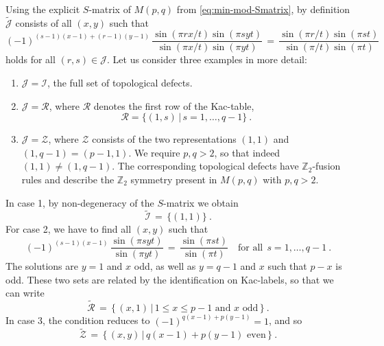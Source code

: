 \documentclass[11pt,a4paper]{article}
\numberwithin{equation}{section}
\begin{document}
\smallskip
Using the explicit $S$-matrix of $M(p,q)$ from \eqref{eq:min-mod-Smatrix}, by definition $\widetilde{\mathcal{J}}$ consists of all $(x,y)$ such that
\begin{equation}
(-1)^{(s-1)(x-1)+(r-1)(y-1)} \,
  \frac{\sin( \pi rx/ t ) \sin( \pi s y  t) }{\sin( \pi x/ t ) \sin( \pi y  t) } 
\,=\,
\frac{\sin( \pi r/ t ) \sin( \pi s  t) }{
\sin( \pi / t ) \sin( \pi   t)}
\end{equation}
holds for all $(r,s) \in \mathcal{J}$.
Let us consider three examples in more detail:
\begin{enumerate}
    \item  $\mathcal{J} = \mathcal{I}$, the full set of topological defects.

    \item  $\mathcal{J} = \mathcal{R}$, where $\mathcal{R}$ denotes the first row of the Kac-table,
\begin{equation}
    \mathcal{R} = \{ (1,s) \,|\, s = 1,\dots,q-1 \} \ .
\end{equation}

    \item $\mathcal{J} = \mathcal{Z}$, where $\mathcal{Z}$ consists of the two representations $(1,1)$ and $(1,q-1)=(p-1,1)$. We require $p,q>2$, so that indeed $(1,1) \neq (1,q-1)$. The corresponding topological defects have $\mathbb{Z}_2$-fusion rules and describe the $\mathbb{Z}_2$ symmetry present in $M(p,q)$ with $p,q>2$.
\end{enumerate}
In case 1, by non-degeneracy of the $S$-matrix we obtain
\begin{equation}\label{eq:tilde-I-just-11}
    \widetilde{\mathcal{I}} \,=\, \{ (1,1) \} \ .
\end{equation}
For case 2, we have to find all $(x,y)$ such that
\begin{equation}
(-1)^{(s-1)(x-1)} \,
  \frac{   \sin( \pi s y  t) }{  \sin( \pi y  t) } 
\,=\,
\frac{ \sin( \pi s  t) }{
 \sin( \pi   t)}
\quad \text{for all} ~~
 s=1,\dots,q-1 \ .
\end{equation}
The solutions are $y=1$ and $x$ odd, as well as $y=q-1$ and $x$ such that $p-x$ is odd. These two sets are related by the identification on Kac-labels, so that we can write
\begin{equation}
    \widetilde{\mathcal{R}} \,=\, \big\{ \, (x,1) \, \big| \, 1 \le x \le p-1 \text{ and $x$ odd} \, \big\} \ .
\end{equation}
In case 3, the condition reduces to $(-1)^{q(x-1)+p(y-1)} =1$, and so 
\begin{equation}
    \widetilde{\mathcal{Z}} \,=\, \big\{ \, (x,y) \, \big| \, q(x-1)+p(y-1) \text{ even} \, \big\} \ .
\end{equation}
\end{document}
